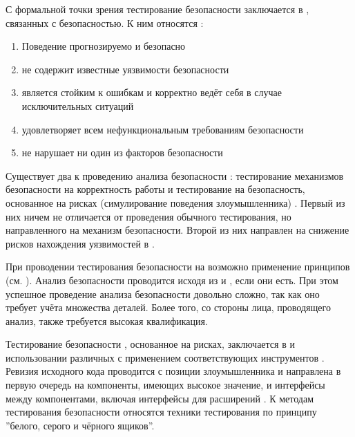 %
С формальной точки зрения тестирование безопасности  заключается в , связанных с безопасностью. 
%
К ним относятся :
\begin{enumerate}
	\setlength{\itemsep}{0pt}%

	\item Поведение  прогнозируемо и безопасно
	
	\item {} не содержит известные уязвимости безопасности
	
	\item {} является стойким к ошибкам и корректно ведёт себя в случае исключительных ситуаций

	\item {} удовлетворяет всем нефункциональным требованиям безопасности

	\item {} не нарушает ни один из факторов безопасности
\end{enumerate}

%
Существует два  к проведению анализа безопасности : тестирование механизмов безопасности на корректность работы и тестирование  на безопасность, основанное на рисках (симулирование поведения злоумышленника) . 
%
Первый из них ничем не отличается от проведения обычного тестирования, но направленного на механизм безопасности. 
%
Второй из них направлен на снижение рисков нахождения уязвимостей в .

%
При проводении тестирования безопасности  на  возможно применение принципов  (см. ). 
%
Анализ безопасности проводится исходя из  и , если они есть. 
%
При этом успешное проведение анализа безопасности довольно сложно, так как оно требует учёта множества деталей. 
%
Более того, со стороны лица, проводящего анализ, также требуется высокая квалификация.

%
Тестирование безопасности , основанное на рисках, заключается в  и использовании различных  с применением соответствующих инструментов . 
%
Ревизия исходного кода проводится с позиции злоумышленника и направлена в первую очередь на компоненты, имеющих высокое значение, и интерфейсы между компонентами, включая интерфейсы для расширений . 
%
К методам тестирования безопасности относятся техники тестирования по принципу ''белого, серого и чёрного ящиков''.

